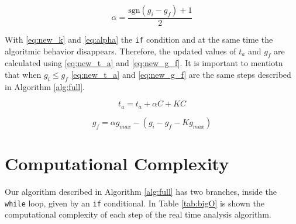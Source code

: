\documentclass[
  12pt,
  a4paperpaper,
]{report}
\begin{document}
\begin{equation}
\alpha =  \frac{ \mathrm{sgn}(g_i-g_f) + 1 }{2}
\label{eq:alpha}
\end{equation}

With \ref{eq:new_k} and \ref{eq:alpha} the \texttt{if} condition and at the same time the algoritmic behavior disappears. 
Therefore, the updated values of \(t_a\) and \(g_f\) are calculated using
\ref{eq:new_t_a} and \ref{eq:new_g_f}. 
It is important to mentiotn that  when
\(g_i \leq g_f\) \ref{eq:new_t_a} and \ref{eq:new_g_f} are the same steps described in Algorithm \ref{alg:full}.

\begin{equation}
t_a = t_a + \alpha C+ KC
\label{eq:new_t_a}
\end{equation}

\begin{equation}
g_f = \alpha g_{max} - (g_i -  g_f - K g_{max} )
\label{eq:new_g_f}
\end{equation}

\hypertarget{computational-complexity}{%
\section{Computational Complexity}\label{computational-complexity}}

Our algorithm described in Algorithm \ref{alg:full} has two branches,
inside the \texttt{while} loop, given by an \texttt{if} conditional. In
Table \ref{tab:bigO} is shown the computational complexity of each step
of the real time analysis algorithm.
\end{document}
